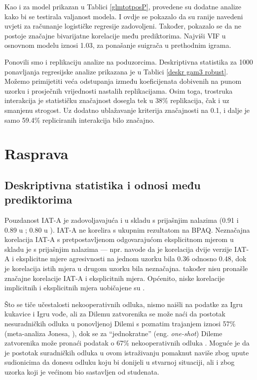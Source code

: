 \documentclass[a4paper, 12pt]{report}
\begin{document}
Kao i za model prikazan u Tablici \ref{glmtotposP}, provedene su dodatne analize
kako bi se testirala valjanost modela. I ovdje se pokazalo da su ranije navedeni
uvjeti za računanje logističke regresije zadovoljeni. Također, pokazalo se da ne
postoje značajne bivarijatne korelacije među prediktorima. Najviši VIF u
osnovnom modelu iznosi 1.03, za ponašanje suigrača u prethodnim igrama.

Ponovili smo i replikaciju analize na poduzorcima. Deskriptivna statistika za
1000 ponavljanja regresijske analize prikazana je u Tablici \ref{deskr gam3 robust}. 
Možemo primijetiti veća odstupanja
između koeficijenata dobivenih na punom uzorku i prosječnih vrijednosti nastalih
replikacijama. Osim toga, trostruka interakcija  je statističku
značajnost dosegla tek u 38\% replikacija, čak i uz smanjenu strogost. Uz
dodatno ublažavanje kriterija značajnosti na 0.1, i dalje je samo 59.4\%
repliciranih interakcija bilo značajno. 

\section{Rasprava}

\subsection{Deskriptivna statistika i odnosi među prediktorima}

Pouzdanost IAT-A je zadovoljavajuća i u skladu s prijašnjim nalazima 
(0.91 i 0.89 u \citealp{richetin2010predictive}; 0.80 u
\citealp{banse2015predicting}).
IAT-A ne korelira s ukupnim rezultatom na BPAQ. 
Neznačajna korelacija IAT-A s pretpostavljenom odgovarajućom eksplicitnom mjerom
u skladu je s prijašnjim nalazima --- npr. \citet{banse2015predicting}
navode da je korelacija dvije verzije IAT-A i eksplicitne mjere agresivnosti na
jednom uzorku bila 0.36 odnosno 0.48, dok je korelacija istih mjera u drugom
uzorku bila neznačajna. \citet{richetin2010predictive} također nisu
pronašle značajne korelacije IAT-A i eksplicitnih mjera.
Općenito, niske korelacije  implicitnih i eksplicitnih mjera uobičajene su 
\citep{uhlmann2012getting, mcclelland1989self}.

Što se tiče učestalosti nekooperativnih odluka, nismo naišli na podatke za
Igru kukavice i Igru vođe, ali za Dilemu zatvorenika se može naći 
da postotak nesuradničkih odluka u ponovljenoj Dilemi s poznatim
trajanjem iznosi 57\% (meta-analiza Jonesa, \citeyear{jones2008smarter}), dok se za
\enquote{jednokratne}
(eng. \emph{one-shot}) Dileme zatvorenika može pronaći podatak o 67\%
nekooperativnih odluka \citep{shafir1992thinking}. Moguće je da je postotak
suradničkih odluka u ovom istraživanju pomaknut naviše zbog upute sudionicima da
donesu odluku koju bi donijeli u stvarnoj situaciji, ali i zbog uzorka koji je
većinom bio sastavljen od studenata.
\end{document}
